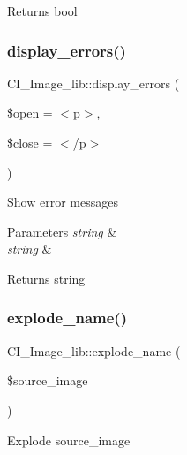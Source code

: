 \begin{DoxyReturn}{Returns}
bool 
\end{DoxyReturn}
\mbox{\label{class_c_i___image__lib_affc884b30934705d4fbee6f34ea152c0}} 
\subsubsection{\texorpdfstring{display\+\_\+errors()}{display\_errors()}}
{\footnotesize\ttfamily C\+I\+\_\+\+Image\+\_\+lib\+::display\+\_\+errors (\begin{DoxyParamCaption}\item[{}]{\$open = {\ttfamily \textquotesingle{}$<$p$>$\textquotesingle{}},  }\item[{}]{\$close = {\ttfamily \textquotesingle{}$<$/p$>$\textquotesingle{}} }\end{DoxyParamCaption})}

Show error messages


\begin{DoxyParams}{Parameters}
{\em string} & \\
\hline
{\em string} & \\
\hline
\end{DoxyParams}
\begin{DoxyReturn}{Returns}
string 
\end{DoxyReturn}
\mbox{\label{class_c_i___image__lib_ad42df82a847b50d76aed5ab662c11f3d}} 
\subsubsection{\texorpdfstring{explode\+\_\+name()}{explode\_name()}}
{\footnotesize\ttfamily C\+I\+\_\+\+Image\+\_\+lib\+::explode\+\_\+name (\begin{DoxyParamCaption}\item[{}]{\$source\+\_\+image }\end{DoxyParamCaption})}

Explode source\+\_\+image

